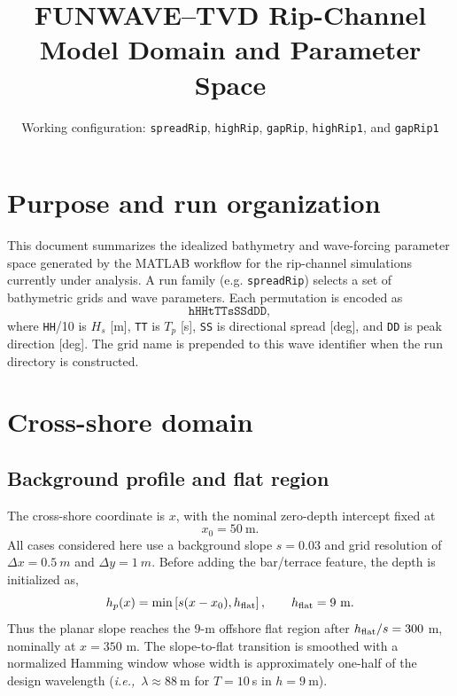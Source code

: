 \documentclass[11pt]{article}
\title{FUNWAVE--TVD Rip-Channel Model Domain and Parameter Space}
\author{}
\date{Working configuration: \texttt{spreadRip}, \texttt{highRip}, \texttt{gapRip}, \texttt{highRip1}, and \texttt{gapRip1}}
\newcommand{\ie}{{\it i.e.,}~}
\begin{document}
\maketitle

\section{Purpose and run organization}
This document summarizes the idealized bathymetry and wave-forcing parameter space generated by the MATLAB workflow for the rip-channel simulations currently under analysis.  A run family (e.g. \texttt{spreadRip}) selects a set of bathymetric grids and wave parameters.  Each permutation is encoded as
\begin{equation}
\texttt{hHHtTTsSSdDD},
\end{equation}
where \texttt{HH}/10 is $H_s$ [m], \texttt{TT} is $T_p$ [s], \texttt{SS} is directional spread [deg], and \texttt{DD} is peak direction [deg].  The grid name is prepended to this wave identifier when the run directory is constructed.

\section{Cross-shore domain}
\subsection{Background profile and flat region}
The cross-shore coordinate is $x$, with the nominal zero-depth intercept fixed at
\begin{equation}
 x_0=50~\mathrm{m}.
\end{equation}
All cases considered here use a background slope $s=0.03$ and grid
resolution of $\Delta x=0.5~\unit{m}$ and $\Delta y=1~\unit{m}$.
Before adding the bar/terrace feature, the depth is initialized as,
\begin{equation}
 h_p(x)=\min\left[s(x-x_0),h_{\rm flat}\right],\qquad h_{\rm flat}=9~\mathrm{m}.
\end{equation}
Thus the planar slope reaches the $9$-m offshore flat region after $h_{\rm
  flat}/s=300$ m, nominally at $x=350$ m.  The slope-to-flat
transition is smoothed with a normalized Hamming window whose width is
approximately one-half of the design wavelength (\ie $\lambda\approx 88~$m for $T=10~$s in $h=9~$m).
\end{document}
